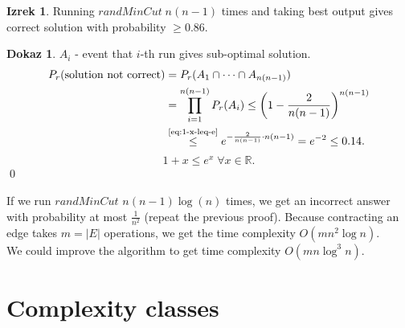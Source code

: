 \documentclass[a4paper, 12pt]{book}
\theoremstyle{definition}
\newtheorem{theorem}[counter]{Izrek}
\newtheorem{pro}[counter]{Dokaz}
\theoremstyle{remark}
\newcommand{\R}{\mathbb{R}}
\begin{document}
\begin{theorem}
  Running $randMinCut \; n(n-1)$ times and taking best output gives correct solution with probability $\geq 0.86$.
\end{theorem}
\begin{pro}
  $A_i$ - event that $i$-th run gives sub-optimal solution.
  \begin{align*}
    P_r(\text{solution not correct}) &= P_r(A_1 \cap \dots \cap A_{n(n-1)}) \\
    &= \prod_{i=1}^{n(n-1)} P_r(A_i) \leq \left(1 - \frac{2}{n(n-1)}\right)^{n(n-1)} \\
    &\stackrel{\refeq{eq:1-x-leq-e}}{\leq} e^{-\frac{2}{n(n-1)} \cdot n(n-1)} = e^{-2} \leq 0.14.
  \end{align*}
  \begin{equation}
    \label{eq:1-x-leq-e}
    1 + x \leq e^x \; \forall x \in \R.
  \end{equation}
  \qed
\end{pro}
If we run $randMinCut$ $n(n-1) \log(n)$ times, we get an incorrect answer with probability at most $\frac{1}{n^2}$ (repeat the previous proof). Because contracting an edge takes
$m = |E|$ operations, we get the time complexity $O\left(mn^2 \log n\right)$.\\
We could improve the algorithm to get time complexity $O\left(mn \log^3 n\right)$.



\chapter{Complexity classes}
\end{document}
